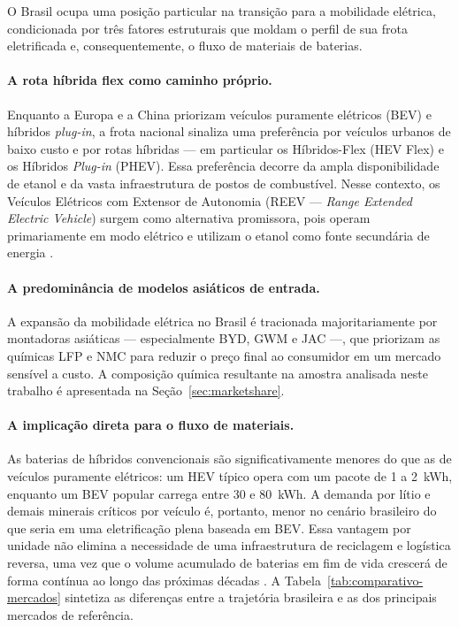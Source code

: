 O Brasil ocupa uma posição particular na transição para a mobilidade elétrica,
condicionada por três fatores estruturais que moldam o perfil de sua frota
eletrificada e, consequentemente, o fluxo de materiais de baterias.

\paragraph{A rota híbrida flex como caminho próprio.}
Enquanto a Europa e a China priorizam veículos puramente elétricos (BEV) e
híbridos \textit{plug-in}, a frota nacional sinaliza uma preferência por
veículos urbanos de baixo custo e por rotas híbridas — em particular os
Híbridos-Flex (HEV Flex) e os Híbridos \textit{Plug-in} (PHEV). Essa preferência
decorre da ampla disponibilidade de etanol e da vasta infraestrutura de postos de
combustível. Nesse contexto, os Veículos Elétricos com Extensor de Autonomia
(REEV — \textit{Range Extended Electric Vehicle}) surgem como alternativa
promissora, pois operam primariamente em modo elétrico e utilizam o etanol como
fonte secundária de energia \cite{BrightConsulting}.

\paragraph{A predominância de modelos asiáticos de entrada.}
A expansão da mobilidade elétrica no Brasil é tracionada majoritariamente por
montadoras asiáticas — especialmente BYD, GWM e JAC —, que priorizam as químicas
LFP e NMC para reduzir o preço final ao consumidor em um mercado sensível a
custo. A composição química resultante na amostra analisada neste trabalho é
apresentada na Seção~\ref{sec:marketshare}.

\paragraph{A implicação direta para o fluxo de materiais.}
As baterias de híbridos convencionais são significativamente menores do que as
de veículos puramente elétricos: um HEV típico opera com um pacote de 1 a 2~kWh,
enquanto um BEV popular carrega entre 30 e 80~kWh. A demanda por lítio e demais
minerais críticos por veículo é, portanto, menor no cenário brasileiro do que
seria em uma eletrificação plena baseada em BEV. Essa vantagem por unidade não
elimina a necessidade de uma infraestrutura de reciclagem e logística reversa,
uma vez que o volume acumulado de baterias em fim de vida crescerá de forma
contínua ao longo das próximas décadas \cite{EPE2025,MBCBrasil}. A
Tabela~\ref{tab:comparativo-mercados} sintetiza as diferenças entre a trajetória
brasileira e as dos principais mercados de referência.

